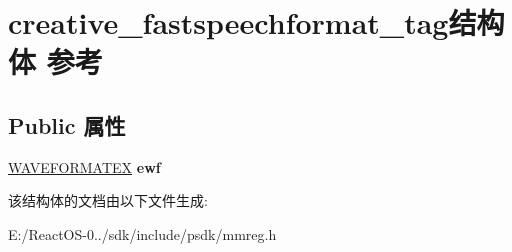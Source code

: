 \hypertarget{structcreative__fastspeechformat__tag}{}\section{creative\+\_\+fastspeechformat\+\_\+tag结构体 参考}
\label{structcreative__fastspeechformat__tag}
\subsection*{Public 属性}
\begin{DoxyCompactItemize}
\item 
\mbox{\label{structcreative__fastspeechformat__tag_a658ea7c16e72bc849d0f73829a0a3a9a}} 
\hyperlink{struct_w_a_v_e_f_o_r_m_a_t_e_x}{W\+A\+V\+E\+F\+O\+R\+M\+A\+T\+EX} {\bfseries ewf}
\end{DoxyCompactItemize}


该结构体的文档由以下文件生成\+:\begin{DoxyCompactItemize}
\item 
E\+:/\+React\+O\+S-\/0../sdk/include/psdk/mmreg.\+h\end{DoxyCompactItemize}
